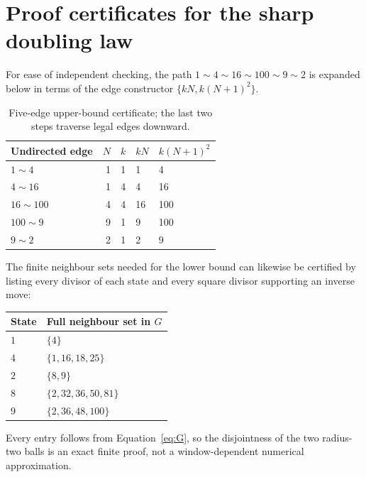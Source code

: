 \documentclass[11pt,a4paper]{article}
\theoremstyle{definition}\newtheorem{definition}[theorem]{Definition}
\begin{document}
\section{Proof certificates for the sharp doubling law}
\label{app:certificate}
For ease of independent checking, the path $1\sim4\sim16\sim100\sim9\sim2$ is expanded below in terms of the edge constructor $\{kN,k(N+1)^2\}$.
\begin{table}[htbp]
\centering\small
\caption{Five-edge upper-bound certificate; the last two steps traverse legal edges downward.}
\begin{tabular}{@{}lrrll@{}}
\toprule
Undirected edge & $N$ & $k$ & $kN$ & $k(N+1)^2$\\
\midrule
$1\sim4$ &1&1&1&4\\
$4\sim16$&1&4&4&16\\
$16\sim100$&4&4&16&100\\
$100\sim9$&9&1&9&100\\
$9\sim2$&2&1&2&9\\
\bottomrule
\end{tabular}
\end{table}

The finite neighbour sets needed for the lower bound can likewise be certified by listing every divisor of each state and every square divisor supporting an inverse move:
\begin{center}\small
\begin{tabular}{@{}lp{9.2cm}@{}}
\toprule
State & Full neighbour set in $G$\\
\midrule
$1$ & $\{4\}$\\
$4$ & $\{1,16,18,25\}$\\
$2$ & $\{8,9\}$\\
$8$ & $\{2,32,36,50,81\}$\\
$9$ & $\{2,36,48,100\}$\\
\bottomrule
\end{tabular}
\end{center}
Every entry follows from Equation~\eqref{eq:G}, so the disjointness of the two radius-two balls is an exact finite proof, not a window-dependent numerical approximation.
\end{document}
